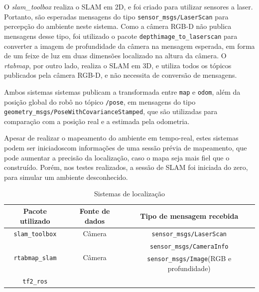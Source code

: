 \documentclass[repeatfields,xlists,xpacks,oneside,yearsonly]{ufrgscca}
\begin{document}
O \textit{slam\_toolbox} realiza o SLAM em 2D, e foi criado para utilizar sensores
a laser. Portanto, são esperadas mensagens do tipo \texttt{sensor\_msgs/LaserScan}
para percepção do ambiente neste sistema. Como a câmera RGB-D não publica mensagens 
desse tipo, foi utilizado o pacote \texttt{depthimage\_to\_laserscan} para converter
a imagem de profundidade da câmera na mensagem esperada, em forma de um feixe de luz
em duas dimensões localizado na altura da câmera.
O \textit{rtabmap}, por outro lado, realiza o SLAM em 3D, e utiliza todos os
tópicos publicados pela câmera RGB-D, e não necessita de conversão de mensagens.

Ambos sistemas sistemas publicam a transformada entre \texttt{map} e \texttt{odom},
além da posição global do robô no tópico \texttt{/pose}, em mensagens do tipo 
\texttt{geometry\_msgs/PoseWithCovarianceStamped}, que são utilizadas para 
comparação com a posição real e a estimada pela odometria.

Apesar de realizar o mapeamento do ambiente em tempo-real, estes sistemas 
podem ser iniciadoscom informações de uma sessão prévia de mapeamento, 
que pode aumentar a precisão da localização, caso o mapa seja mais fiel 
que o construído. Porém, nos testes realizados, a sessão de SLAM foi iniciada
do zero, para simular um ambiente desconhecido.


\begin{table}[h]
    \begin{center}
        \caption{Sistemas de localização}
        \label{tab:localizacao}
        \begin{tabular}{c|c|c}
            Pacote utilizado & Fonte de dados & Tipo de mensagem recebida \\
            \hline
            \texttt{slam\_toolbox} & Câmera & \texttt{sensor\_msgs/LaserScan}\\ 
            \hline
            \multirow{2}{*}{\texttt{rtabmap\_slam}} & \multirow{2}{*}{Câmera} & \texttt{sensor\_msgs/CameraInfo} \\
                                                    &                               & \texttt{sensor\_msgs/Image}(RGB e profundidade) \\ 
            \hline
            \texttt{tf2\_ros} & &  \\
        \end{tabular}
    \end{center}
\end{table}
\end{document}
